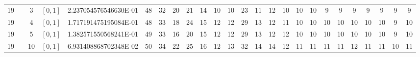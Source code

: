 \documentclass{article}
\begin{document}
\begin{landscape}
\begin{longtable}{ccccccccccccccccccccccccc}
  19 &  & 3          & $[0,1]$ & 2.237054576546630E-01 & \cellcolor{red!75} 48        &\cellcolor{red!5} 32        &\cellcolor{red!5} 20        &\cellcolor{red!5} 21        &\cellcolor{green!5} 14        &\cellcolor{green!5} 10        &\cellcolor{green!5} 10        &\cellcolor{red!5} 23        &\cellcolor{green!5} 11        &\cellcolor{green!5} 12        &\cellcolor{green!5} 10        &\cellcolor{green!5} 10        &\cellcolor{green!5} 10        &\cellcolor{green!25} 9         &\cellcolor{green!25} 9         &\cellcolor{green!25} 9         &\cellcolor{green!25} 9         &\cellcolor{green!25} 9         &\cellcolor{green!25} 9         &\cellcolor{green!25} 9\\
  19 &  & 4          & $[0,1]$ & 1.717191475195084E-01 & \cellcolor{red!75} 48        &\cellcolor{red!5} 33        &\cellcolor{red!5} 18        &\cellcolor{red!5} 24        &15        &\cellcolor{green!5} 12        &\cellcolor{green!5} 12        &\cellcolor{red!5} 29        &\cellcolor{green!5} 13        &\cellcolor{green!5} 12        &\cellcolor{green!5} 11        &\cellcolor{green!5} 10        &\cellcolor{green!5} 10        &\cellcolor{green!5} 10        &\cellcolor{green!5} 10        &\cellcolor{green!5} 10        &\cellcolor{green!5} 10        &\cellcolor{green!5} 10        &\cellcolor{green!75} 9         &\cellcolor{green!5} 10\\
  19 &  & 5          & $[0,1]$ & 1.382571550568241E-01 & \cellcolor{red!75} 49        &\cellcolor{red!5} 33        &16        &\cellcolor{red!5} 20        &15        &\cellcolor{green!5} 12        &\cellcolor{green!5} 12        &\cellcolor{red!5} 29        &\cellcolor{green!5} 13        &\cellcolor{green!5} 12        &\cellcolor{green!5} 12        &\cellcolor{green!5} 10        &\cellcolor{green!5} 10        &\cellcolor{green!5} 10        &\cellcolor{green!5} 10        &\cellcolor{green!5} 10        &\cellcolor{green!5} 10        &\cellcolor{green!5} 10        &\cellcolor{green!75} 9         &\cellcolor{green!5} 10\\
  19 &  & 10         & $[0,1]$ & 6.931408868702348E-02 & \cellcolor{red!75} 50        &\cellcolor{red!5} 34        &\cellcolor{red!5} 22        &\cellcolor{red!5} 25        &16        &\cellcolor{green!5} 12        &\cellcolor{green!5} 13        &\cellcolor{red!5} 32        &\cellcolor{green!5} 14        &\cellcolor{green!5} 14        &\cellcolor{green!5} 12        &\cellcolor{green!5} 11        &\cellcolor{green!5} 11        &\cellcolor{green!5} 11        &\cellcolor{green!5} 11        &\cellcolor{green!5} 12        &\cellcolor{green!5} 11        &\cellcolor{green!5} 11        &\cellcolor{green!75} 10        &\cellcolor{green!5} 11\\

\end{longtable}
\end{landscape}
\end{document}
